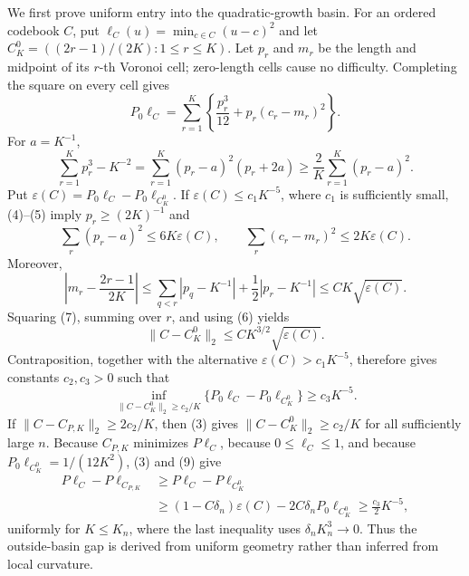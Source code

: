 We first prove uniform entry into the quadratic-growth basin.  For an ordered codebook \(C\), put \(\ell_C(u)=\min_{c\in C}(u-c)^2\) and let \(C_K^0=((2r-1)/(2K):1\leq r\leq K)\).  Let \(p_r\) and \(m_r\) be the length and midpoint of its \(r\)-th Voronoi cell; zero-length cells cause no difficulty.  Completing the square on every cell gives
\[
 P_0\ell_C=\sum_{r=1}^K\left\{\frac{p_r^3}{12}+p_r(c_r-m_r)^2\right\}.       \tag{4}
\]
For \(a=K^{-1}\),
\[
 \sum_{r=1}^Kp_r^3-K^{-2}
 =\sum_{r=1}^K(p_r-a)^2(p_r+2a)
 \geq\frac2K\sum_{r=1}^K(p_r-a)^2.                                         \tag{5}
\]
Put \(\varepsilon(C)=P_0\ell_C-P_0\ell_{C_K^0}\).  If \(\varepsilon(C)\leq c_1K^{-5}\), where \(c_1\) is sufficiently small, (4)--(5) imply \(p_r\geq(2K)^{-1}\) and
\[
 \sum_r(p_r-a)^2\leq6K\varepsilon(C),\qquad
 \sum_r(c_r-m_r)^2\leq2K\varepsilon(C).                                    \tag{6}
\]
Moreover,
\[
 \left|m_r-\frac{2r-1}{2K}\right|
 \leq\sum_{q<r}|p_q-K^{-1}|+\frac12|p_r-K^{-1}|
 \leq CK\sqrt{\varepsilon(C)}.                                              \tag{7}
\]
Squaring (7), summing over \(r\), and using (6) yields
\[
 \|C-C_K^0\|_2\leq CK^{3/2}\sqrt{\varepsilon(C)}.                           \tag{8}
\]
Contraposition, together with the alternative \(\varepsilon(C)>c_1K^{-5}\), therefore gives constants \(c_2,c_3>0\) such that
\[
 \inf_{\|C-C_K^0\|_2\geq c_2/K}
 \{P_0\ell_C-P_0\ell_{C_K^0}\}\geq c_3K^{-5}.                              \tag{9}
\]
If \(\|C-C_{P,K}\|_2\geq2c_2/K\), then (3) gives \(\|C-C_K^0\|_2\geq c_2/K\) for all sufficiently large \(n\).  Because \(C_{P,K}\) minimizes \(P\ell_C\), because \(0\leq\ell_C\leq1\), and because \(P_0\ell_{C_K^0}=1/(12K^2)\), (3) and (9) give
\[
\begin{aligned}
 P\ell_C-P\ell_{C_{P,K}}
 &\geq P\ell_C-P\ell_{C_K^0}\\
 &\geq(1-C\delta_n)\varepsilon(C)-2C\delta_nP_0\ell_{C_K^0}
 \geq \frac{c_3}{2}K^{-5},
\end{aligned}                                                               \tag{10}
\]
uniformly for \(K\leq K_n\), where the last inequality uses \(\delta_nK_n^3\to0\).  Thus the outside-basin gap is derived from uniform geometry rather than inferred from local curvature.

